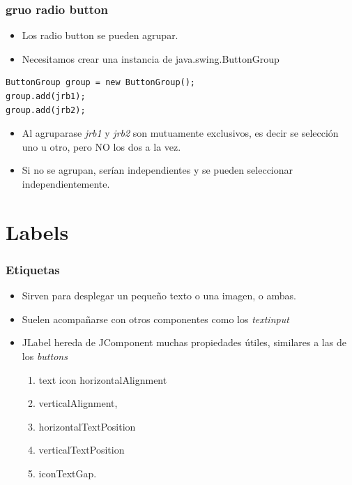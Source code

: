 \documentclass{beamer}
\begin{document}
\begin{frame}[fragile]
\frametitle{gruo radio button}
\begin{itemize}[<+->]
\item Los radio button se pueden agrupar.
\item Necesitamos crear una instancia de \alert{java.swing.ButtonGroup}
\end{itemize}
\pause
\begin{verbatim}
ButtonGroup group = new ButtonGroup();
group.add(jrb1);
group.add(jrb2);
\end{verbatim}
\begin{itemize}[<+->]
\item Al agruparase \emph{jrb1} y \emph{jrb2} son mutuamente exclusivos, es decir se selección uno u otro, pero NO los dos a la vez.
\item Si no se agrupan, serían independientes y se pueden seleccionar independientemente.
\end{itemize}
\end{frame}

\section{Labels}
\begin{frame}
\frametitle{Etiquetas}
\begin{itemize}[<+->]
\item Sirven para desplegar un pequeño texto o una imagen, o ambas.
\item Suelen acompañarse con otros componentes como los \emph{textinput}
\item \alert{JLabel} hereda de \alert{JComponent} muchas propiedades útiles, similares a las de los \emph{buttons}
\begin{enumerate}
\item text
\text icon
\text horizontalAlignment
\item verticalAlignment,
\item horizontalTextPosition
\item verticalTextPosition
\item iconTextGap.
\end{enumerate}
\end{itemize}
\end{frame}
\end{document}
